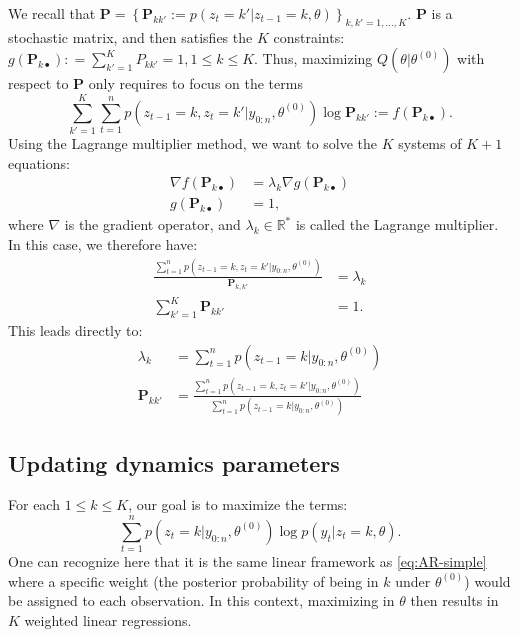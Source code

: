 \documentclass[]{book}
\begin{document}
We recall that \(\mathbf{P} = \left \lbrace\mathbf{P}_{kk'} := p(z_{t} = k' \vert z_{t - 1} = k, \theta) \right\rbrace_{k,k' = 1,\dots, K}\). \(\mathbf{P}\) is a stochastic matrix, and then satisfies the \(K\) constraints:
\(g(\mathbf{P}_{k\bullet}): = \sum_{k'=1}^K P_{kk'} = 1, 1\leq k \leq K\).
Thus, maximizing \(Q(\theta \vert \theta^{(0)})\) with respect to \(\mathbf{P}\) only requires to focus on the terms
\[\sum_{k' = 1}^K \sum_{t = 1}^ np(z_{t-1} = k, z_{t} = k'\vert y_{0:n}, \theta^{(0)}) \log \mathbf{P}_{kk'} := f(\mathbf{P}_{k\bullet}).\]
Using the Lagrange multiplier method, we want to solve the \(K\) systems of \(K + 1\) equations:
\begin{align*}
\nabla f(\mathbf{P}_{k\bullet}) &= \lambda_k \nabla g(\mathbf{P}_{k\bullet})\\
g(\mathbf{P}_{k\bullet}) &= 1,
\end{align*}
where \(\nabla\) is the gradient operator, and \(\lambda_k \in \mathbb{R}^*\) is called the Lagrange multiplier. In this case, we therefore have:
\begin{align*}
\frac{\sum_{t = 1}^n p(z_{t-1} = k, z_{t} = k'\vert y_{0:n}, \theta^{(0)})}{\mathbf{P}_{k,k'}} &= \lambda_k \\
\sum_{k' = 1}^K{\mathbf{P}_{kk'}} &= 1.
\end{align*}
This leads directly to:
\begin{align*}
\lambda_k &= \sum_{t = 1}^n p(z_{t - 1} = k \vert y_{0:n}, \theta^{(0)}) \\
\mathbf{P}_{kk'} &= \frac{\sum_{t = 1}^n p(z_{t - 1} = k, z_{t} = k'\vert y_{0:n}, \theta^{(0)}) }{\sum_{t = 1}^n p(z_{t - 1} = k \vert y_{0:n}, \theta^{(0)})}
\end{align*}

\hypertarget{updating-dynamics-parameters}{%
\subsection*{Updating dynamics parameters}\label{updating-dynamics-parameters}}

For each \(1\leq k \leq K\), our goal is to maximize the terms:
\[\sum_{t = 1}^n p(z_t = k\vert y_{0:n}, \theta^{(0)}) \log p(y_{t} \vert z_{t} = k, \theta).\]
One can recognize here that it is the same linear framework as \eqref{eq:AR-simple} where a specific weight (the posterior probability of being in \(k\) under \(\theta^{(0)}\)) would be assigned to each observation.
In this context, maximizing in \(\theta\) then results in \(K\) weighted linear regressions.
\end{document}
